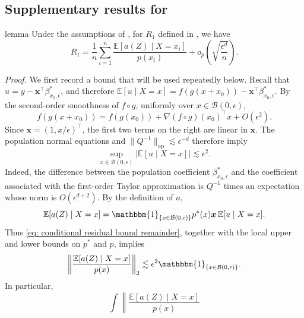 \documentclass[11pt]{article}
\begin{document}
\begin{appendices}
\subsection{Supplementary results for }

\begin{restatable}{lemma}{} \label{lemma: remainder term}
    Under the assumptions of , for $R_1$ defined in , we have
    \[
        R_1
        =
        \frac{1}{n}\sum_{i=1}^n
        \frac{\mathbb{E}[a(Z)\mid X=x_i]}{p(x_i)}
        +
        o_p\left(\sqrt{\frac{\epsilon^d}{n}}\right).
    \]
\end{restatable}
\noindent \textit{Proof.}
We first record a bound that will be used repeatedly below. Recall that $u=y-\boldsymbol{x}^\top\beta_{x_0,\epsilon}^*$, and therefore
$\mathbb{E}[u\mid X=x]=f(g(x+x_0))-\boldsymbol{x}^\top\beta_{x_0,\epsilon}^*$. By the second-order smoothness of $f\circ g$, uniformly over $x\in\mathcal{B}(0,\epsilon)$,
\[
    f(g(x+x_0))
    =
    f(g(x_0))
    +
    \nabla(f\circ g)(x_0)^\top x
    +
    O(\epsilon^2).
\]
Since $\boldsymbol{x}=(1,x/\epsilon)^\top$, the first two terms on the right are linear in $\boldsymbol{x}$. The population normal equations and $\|Q^{-1}\|_{\operatorname{op}}\lesssim\epsilon^{-d}$ therefore imply
\begin{equation}
    \sup_{x\in\mathcal{B}(0,\epsilon)}
    |\mathbb{E}[u\mid X=x]|
    \lesssim \epsilon^2.
    \label{eq: conditional residual bound remainder}
\end{equation}
Indeed, the difference between the population coefficient $\beta_{x_0,\epsilon}^*$ and the coefficient associated with the first-order Taylor approximation is $Q^{-1}$ times an expectation whose norm is $O(\epsilon^{d+2})$. By the definition of $a$,
\[
    \mathbb{E}[a(Z)\mid X=x]
    =
    \mathbbm{1}_{\{x\in\mathcal{B}(0,\epsilon)\}}
    p^*(x)\boldsymbol{x}\,\mathbb{E}[u\mid X=x].
\]
Thus \cref{eq: conditional residual bound remainder}, together with the local upper and lower bounds on $p^*$ and $p$, implies
\begin{equation}
    \left\|
        \frac{\mathbb{E}[a(Z)\mid X=x]}{p(x)}
    \right\|_2
    \lesssim
    \epsilon^2\mathbbm{1}_{\{x\in\mathcal{B}(0,\epsilon)\}}.
    \label{eq: conditional a bound remainder}
\end{equation}
In particular,
\begin{equation}
    \int
    \left\|
        \frac{\mathbb{E}[a(Z)\mid X=x]}{p(x)}

\end{equation}
\end{appendices}
\end{document}
